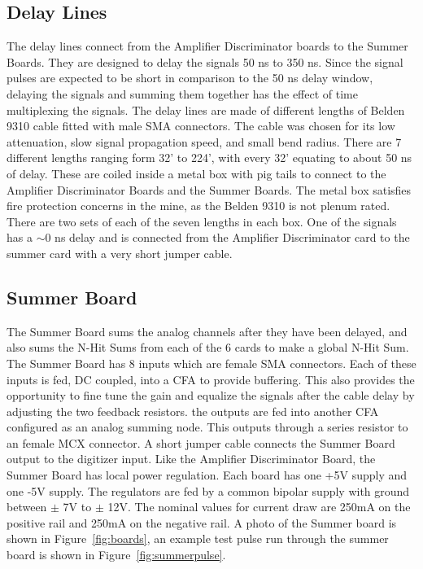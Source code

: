 \documentclass{JINST}
\begin{document}
\subsection{Delay Lines}
\label{sec:Delay}
%
The delay lines connect from the Amplifier Discriminator boards to the
Summer Boards.  They are designed to delay the signals 50 ns to 350
ns.  Since the signal pulses are expected to be short in
comparison to the 50 ns delay window, delaying the signals and summing
them together has the effect of time multiplexing the signals.  The
delay lines are made of different lengths of Belden 9310 cable fitted
with male SMA connectors.  The cable was chosen for its low
attenuation, slow signal propagation speed, and small bend radius.
There are 7 different lengths ranging form 32' to 224', with every 32'
equating to about 50 ns of delay.  These are coiled inside a metal box
with pig tails to connect to the Amplifier Discriminator Boards and
the Summer Boards.  The metal box satisfies fire protection concerns
in the mine, as the Belden 9310 is not plenum rated.  There are two
sets of each of the seven lengths in each box.  One of the signals has
a $\sim$0 ns delay and is connected from the Amplifier Discriminator card to
the summer card with a very short jumper cable.

\subsection{Summer Board}
\label{sec:Sum}
%
The Summer Board sums the analog channels after they have been
delayed, and also sums the N-Hit Sums from each of the 6 cards to make
a global N-Hit Sum.  The Summer Board has 8 inputs which are female
SMA connectors.  Each of these inputs is fed, DC coupled, into a CFA
to provide buffering.  This also provides the opportunity to fine tune
the gain and equalize the signals after the cable delay by adjusting
the two feedback resistors.  the outputs are fed into another CFA
configured as an analog summing node.  This outputs through a series
resistor to an female MCX connector.  A short jumper cable connects
the Summer Board output to the digitizer input.  Like the Amplifier
Discriminator Board, the Summer Board has local power regulation.
Each board has one +5V supply and one -5V supply.  The regulators are
fed by a common bipolar supply with ground between $\pm$ 7V to $\pm$
12V.  The nominal values for current draw are 250mA on the positive
rail and 250mA on the negative rail.  A photo of the Summer
board is shown in Figure~\ref{fig:boards}, an example test pulse run
through the summer board is shown in Figure~\ref{fig:summerpulse}.
\end{document}
